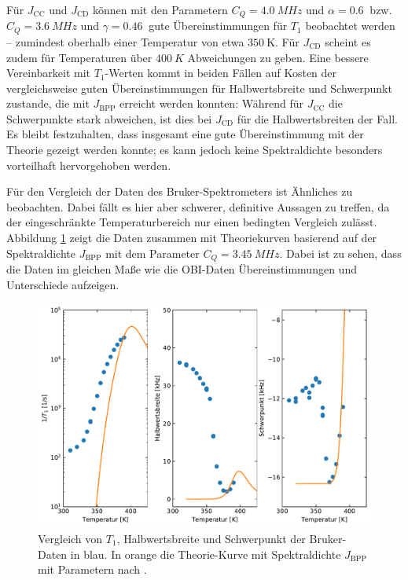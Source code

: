 Für $J_\text{CC}$ und $J_\text{CD}$ können mit den Parametern $C_Q = \SI{4.0}{MHz}$ und $\alpha = \SI{0.6}{}$ bzw. $C_Q = \SI{3.6}{MHz}$ und $\gamma = \SI{0.46}{}$ gute Übereinstimmungen für $T_1$ beobachtet werden -- zumindest oberhalb einer Temperatur von etwa $\SI{350}{\kelvin}$. Für $J_\text{CD}$ scheint es zudem für Temperaturen über $\SI{400}{K}$ Abweichungen zu geben. Eine bessere Vereinbarkeit mit $T_1$-Werten kommt in beiden Fällen auf Kosten der vergleichsweise guten Übereinstimmungen für Halbwertsbreite und Schwerpunkt zustande, die mit $J_\text{BPP}$ erreicht werden konnten: Während für $J_\text{CC}$ die Schwerpunkte stark abweichen, ist dies bei $J_\text{CD}$ für die Halbwertsbreiten der Fall. Es bleibt festzuhalten, dass insgesamt eine gute Übereinstimmung mit der Theorie gezeigt werden konnte; es kann jedoch keine Spektraldichte besonders vorteilhaft hervorgehoben werden.

Für den Vergleich der Daten des Bruker-Spektrometers ist Ähnliches zu beobachten. Dabei fällt es hier aber schwerer, definitive Aussagen zu treffen, da der eingeschränkte Temperaturbereich nur einen bedingten Vergleich zulässt. Abbildung \ref{fig:res:theorie_bruker} zeigt die Daten zusammen mit Theoriekurven basierend auf der Spektraldichte $J_\text{BPP}$ mit dem Parameter $C_Q = \SI{3.45}{MHz}$. Dabei ist zu sehen, dass die Daten im gleichen Maße wie die OBI-Daten Übereinstimmungen und Unterschiede aufzeigen.
\begin{figure}
	\begin{center}
		\includegraphics[width=.9\textwidth]{graphics/plot/Bruker_J_01.pdf}
	\end{center}
	\caption{Vergleich von $T_1$, Halbwertsbreite und Schwerpunkt der Bruker-Daten in blau. In orange die Theorie-Kurve mit Spektraldichte $J_\text{BPP}$ mit Parametern nach \cite{PIMENOV199793}.} \label{fig:res:theorie_bruker}
\end{figure}


